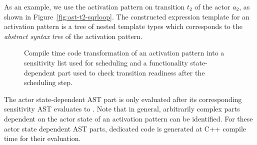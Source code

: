 



As an example, we use the activation pattern on transition $t_2$ of the  actor $a_2$, as shown in Figure~\ref{fig:ast-t2-sqrloop}.
The constructed expression template for an activation pattern is a tree of nested template types which corresponds to the \emph{abstract syntax tree} of the activation pattern.%

\begin{figure}[t]
\centering
\resizebox{\columnwidth}{!}{}
%
\caption{\label{fig:ast-t2-sqrloop}\label{fig:ast-compile-time-transform}%
Compile time code transformation of an activation pattern into a sensitivity list used for scheduling and a functionality state-dependent part used to check transition readiness after the scheduling step.
}
\end{figure}

The actor state-dependent AST part is only evaluated after its corresponding sensitivity AST evaluates to .
Note that in general, arbitrarily complex parts dependent on the actor state of an activation pattern can be identified.
For these actor state dependent AST parts, dedicated code is generated at C++ compile time for their evaluation.

